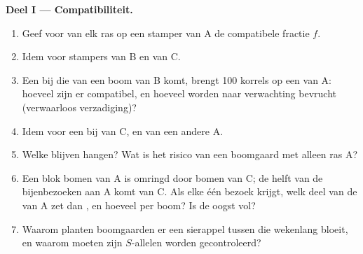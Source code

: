 \begin{problem}
\medskip
\noindent\textbf{Deel I --- Compatibiliteit.}
\begin{enumerate}
  \item Geef voor  van elk ras op een stamper van A de
        compatibele fractie $f$.
  \item Idem voor stampers van B en van C.
  \item Een bij die van een boom van B komt, brengt 100 korrels op een
         van A: hoeveel zijn er compatibel, en hoeveel 
        worden naar verwachting bevrucht (verwaarloos verzadiging)?
  \item Idem voor een bij van C, en van een andere A.
  \item Welke  blijven hangen? Wat is het risico van een boomgaard
        met alleen ras A?
  \item Een blok bomen van A is omringd door bomen van C; de helft van de
        bijenbezoeken aan A komt van C. Als elke  één bezoek krijgt,
        welk deel van de  van A zet dan , en hoeveel 
        per boom? Is de oogst vol?
  \item Waarom planten boomgaarden er een sierappel tussen die wekenlang
        bloeit, en waarom moeten zijn $S$-allelen worden gecontroleerd?
\end{enumerate}


\end{problem}
